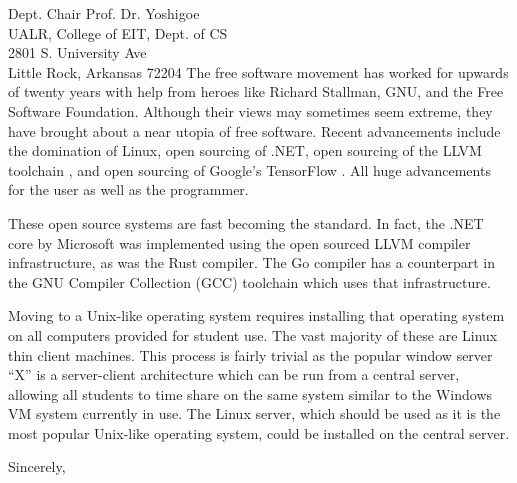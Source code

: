 \documentclass{letter}
\begin{document}
\begin{letter}{
    Dept. Chair Prof. Dr. Yoshigoe \\
    UALR, College of EIT, Dept. of CS \\
    2801 S. University Ave \\
    Little Rock, Arkansas 72204
  }
    The free software movement has worked for upwards of twenty years with help from heroes like Richard Stallman, GNU, and the Free Software Foundation. Although their views may sometimes seem extreme, they have brought about a near utopia of free software. Recent advancements include the domination of Linux, open sourcing of .NET, open sourcing of the LLVM toolchain \cite{LLVMComp}, and open sourcing of Google's TensorFlow \cite{WiredTensorFlow}. All huge advancements for the user as well as the programmer.

    These open source systems are fast becoming the standard. In fact, the .NET core by Microsoft was implemented using the open sourced LLVM compiler infrastructure, as was the Rust compiler. The Go compiler has a counterpart in the GNU Compiler Collection (GCC) toolchain which uses that infrastructure.

    Moving to a Unix-like operating system requires installing that operating system on all computers provided for student use. The vast majority of these are Linux thin client machines. This process is fairly trivial as the popular window server ``X'' is a server-client architecture which can be run from a central server, allowing all students to time share on the same system similar to the Windows VM system currently in use. The Linux server, which should be used as it is the most popular Unix-like operating system, could be installed on the central server.

    \closing{Sincerely,}

  \end{letter}

  \printbibliography
\end{document}
